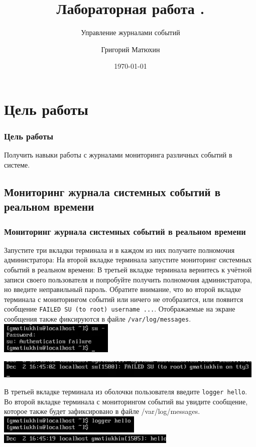 \documentclass{beamer}
\author{Григорий Матюхин}
\date{\today}
\title{Лабораторная работа \textnumero7.}
\subtitle{Управление журналами событий}
\begin{document}
\begin{frame}[plain]
	\titlepage
\end{frame}
\section{Цель работы}
\begin{frame}[plain]
	\frametitle{Цель работы}
	Получить навыки работы с журналами мониторинга различных событий в системе.
\end{frame}

\subsection{Мониторинг журнала системных событий в реальном времени}

\begin{frame}[plain]
	\frametitle{Мониторинг журнала системных событий в реальном времени}
	Запустите три вкладки терминала и в каждом из них получите полномочия администратора:
	На второй вкладке терминала запустите мониторинг системных событий в реальном времени:
	В третьей вкладке терминала вернитесь к учётной записи своего пользователя и попробуйте получить полномочия администратора, но введите неправильный пароль. Обратите внимание, что во второй вкладке терминала с мониторингом событий или ничего не отобразится, или появится сообщение \texttt{FAILED SU (to root) username ...}. Отображаемые на экране сообщения также фиксируются в файле \texttt{/var/log/messages}.
	\\\includegraphics{1.png}
\end{frame}
\begin{frame}[plain]
	\includegraphics{2.png}
\end{frame}
\begin{frame}[plain]
	В третьей вкладке терминала из оболочки пользователя введите \texttt{logger hello}. Во второй вкладке терминала с мониторингом событий вы увидите сообщение, которое также будет зафиксировано в файле /var/log/messages.
	\\\includegraphics{3.png}
	\\\includegraphics{4.png}
\end{frame}
\end{document}
